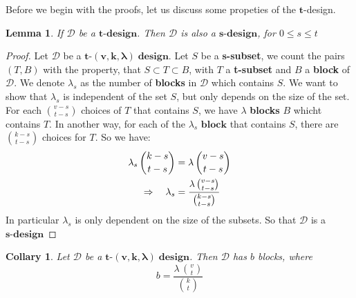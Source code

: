 \documentclass{article}
\newtheorem{lemma}[theorem]{Lemma}
\newtheorem{collary}[theorem]{Collary}
\numberwithin{equation}{theorem}
\newcommand{\tCompleteDesign}{\ensuremath{\bm{t\mbox{-}(v,k,\lambda)\; design}}}
\newcommand{\myBlock}{\textbf{block}}
\newcommand{\pluralMyBlock}{\textbf{blocks}}
\newcommand{\xDesign}[1]{\ensuremath{\bm{#1\mbox{-}design}}}
\newcommand{\dDes}{\ensuremath{\mathscr{D}}}
\begin{document}
Before we begin with the proofs, let us discuss some propeties of the $\bm{t}$-design.
\begin{lemma}\label{propTdesign}
If $\mathscr{D}$ be a $\bm{t\mbox{-}design}$. Then $\mathscr{D}$ is also a $\bm{s\mbox{-}design}$, for $0 \leq s \leq t$
\end{lemma}
\begin{proof}
Let $\mathscr{D}$ be a \tCompleteDesign.
Let $S$ be a \textbf{s-subset}, we count the pairs $(T,B)$ with the property, that $S \subset T \subset B$, with $T$ a \textbf{t-subset} and $B$ a \textbf{block} of $\mathscr{D}$. We denote $\lambda_s$ as the number of \textbf{blocks} in $\mathscr{D}$ which contains $S$. We want to show that $\lambda_s$ is independent of the set $S$, but only depends on the size of the set. 
For each $\binom{v-s}{t-s}$ choices of $T$ that contains $S$, we have $\lambda$ {\pluralMyBlock} $B$ whicht contains $T$. In another way, for each of the $\lambda_s$ $\myBlock$ that contains $S$, there are $\binom{k-s}{t-s}$ choices for $T$. So we have:
\begin{align}
	\lambda_s \, \binom{k-s}{t-s} &= \lambda \, \binom{v-s}{t-s} \notag\\
	\Rightarrow  \quad \lambda_s &= \frac{\lambda \, \binom{v-s}{t-s}}{\binom{k-s}{t-s}} \label{sDesign}
\end{align}
In particular $\lambda_s$ is only dependent on the size of the subsets. So that $\mathscr{D}$ is a \xDesign{s}
\end{proof}

\begin{collary}\label{blockCount}
Let {\dDes} be a \tCompleteDesign.
Then {\dDes} has $b$ blocks, where
\[
	b = \frac{\lambda \, \binom{v}{t}}{\binom{k}{t}}
\]
\end{collary}
\end{document}
